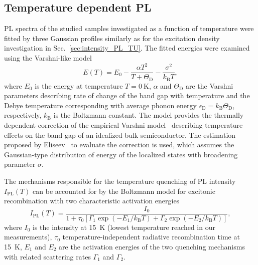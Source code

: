 \subsection{Temperature dependent PL}
\label{Sec:temp_PL_TU}
PL spectra of the studied samples investigated as a function of temperature were fitted by three Gaussian profiles similarly as for the excitation density investigation in Sec.~\ref{sec:intensity_PL_TU}. The fitted energies were examined using the Varshni-like model~\cite{Taiping2014}
%
\begin{equation}
E(T)=E_0-\frac{\alpha T^2}{T+\Theta_\mathrm{D}}-\frac{\sigma^2}{k_\mathrm{B}T}, \label{eq:Varshni-like}
\end{equation}
where $E_0$ is the energy at temperature $T=0~\mathrm{K}$, $\alpha$ and $\Theta_\mathrm{D}$ are the Varshni parameters describing rate of change of the band gap with temperature and the Debye temperature corresponding with average phonon energy $\epsilon_\mathrm{D}=k_\mathrm{B}\Theta_\mathrm{D}$, respectively, $k_\mathrm{B}$ is the Boltzmann constant. The model provides the thermally dependent correction of the empirical Varshni model~\citep{Varshni} describing temperature effects on the band gap of an idealized bulk semiconductor. The estimation proposed by Eliseev~\citep{Eliseev_apl2003_PLtemp} to evaluate the correction is used, which assumes the Gaussian-type distribution of energy of the localized states with broadening parameter $\sigma$.

The mechanisms responsible for the temperature quenching of PL intensity $I_\mathrm{PL}(T)$ can be accounted for by the Boltzmann model for excitonic recombination with two characteristic activation energies~\citep{Daly_prb1995, Alen_apl2011}
\begin{equation}
I_\mathrm{PL}(T)=\frac{I_0}{1+\tau_0\left[\Gamma_1\exp(-E_1/k_\mathrm{B}T)+\Gamma_2\exp(-E_2/k_\mathrm{B}T)\right]},               \label{eq:Arhenius}
\end{equation}
where $I_0$ is the intensity at 15~K (lowest temperature reached in our measurements), $\tau_0$ temperature-independent radiative recombination time at 15~K, $E_1$ and $E_2$ are the activation energies of the two quenching mechanisms with related scattering rates $\Gamma_1$ and $\Gamma_2$.%
\newpage
